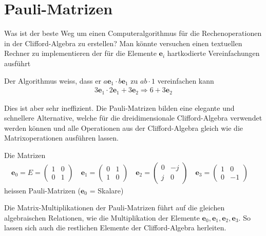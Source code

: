 %
%
%
\section{Pauli-Matrizen}

Was ist der beste Weg um einen Computeralgorithmus für die Rechenoperationen in der Clifford-Algebra zu erstellen? Man könnte versuchen einen textuellen Rechner zu implementieren der für die Elemente $\mathbf{e}_i$ hartkodierte Vereinfachungen ausführt 
\begin{beispiel}
	Der Algorithmus weiss, dass er $a\mathbf{e}_1\cdot b\mathbf{e}_1$ zu $ab\cdot1$ vereinfachen kann
	\begin{align}
		3\mathbf{e}_1 \cdot 2\mathbf{e}_1 + 3\mathbf{e}_2 \Rightarrow 6 + 3\mathbf{e}_2
	\end{align}
\end{beispiel}
Dies ist aber sehr ineffizient. Die Pauli-Matrizen bilden eine elegante und schnellere Alternative, welche für die dreidimensionale Clifford-Algebra verwendet werden können und alle Operationen aus der Clifford-Algebra gleich wie die Matrixoperationen ausführen lassen.
\begin{definition} \label{def:defPauli}
	Die Matrizen
	\begin{align}
		\mathbf{e}_0 = E = 
		\begin{pmatrix}
			1 & 0 \\
			0 & 1
		\end{pmatrix}\quad
		\mathbf{e}_1 =
		\begin{pmatrix}
			0 & 1 \\
			1 & 0
		\end{pmatrix}\quad
		\mathbf{e}_2 =
		\begin{pmatrix}
			0 & -j \\
			j & 0
		\end{pmatrix}\quad
		\mathbf{e}_3 =
		\begin{pmatrix}
			1 & 0 \\
			0 & -1
		\end{pmatrix}\quad	
	\end{align}
	heissen Pauli-Matrizen ($\mathbf{e}_0$ = Skalare)
\end{definition}
Die Matrix-Multiplikationen der Pauli-Matrizen führt auf die gleichen algebraischen Relationen, wie die Multiplikation der Elemente $\mathbf{e}_0, \mathbf{e}_1, \mathbf{e}_2, \mathbf{e}_3$. So lassen sich auch die restlichen Elemente der Clifford-Algebra herleiten.
